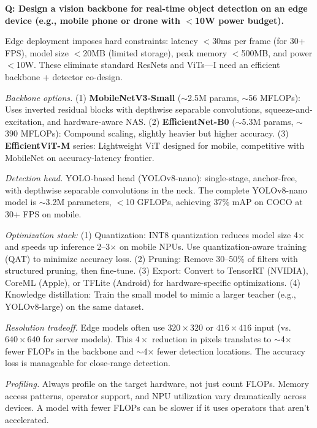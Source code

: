 \begin{interviewq}
\textbf{Q: Design a vision backbone for real-time object detection on an edge device (e.g., mobile phone or drone with $<$10W power budget).}

 \quad {} \quad \badgefreq{\freqmed}

\stronganswer Edge deployment imposes hard constraints: latency $<$30ms per frame (for 30+ FPS), model size $<$20MB (limited storage), peak memory $<$500MB, and power $<$10W. These eliminate standard ResNets and ViTs---I need an efficient backbone + detector co-design.

\textit{Backbone options.} (1) \textbf{MobileNetV3-Small} ($\sim$2.5M params, $\sim$56 MFLOPs): Uses inverted residual blocks with depthwise separable convolutions, squeeze-and-excitation, and hardware-aware NAS. (2) \textbf{EfficientNet-B0} ($\sim$5.3M params, $\sim$390 MFLOPs): Compound scaling, slightly heavier but higher accuracy. (3) \textbf{EfficientViT-M} series: Lightweight ViT designed for mobile, competitive with MobileNet on accuracy-latency frontier.

\textit{Detection head.} YOLO-based head (YOLOv8-nano): single-stage, anchor-free, with depthwise separable convolutions in the neck. The complete YOLOv8-nano model is $\sim$3.2M parameters, $<$10 GFLOPs, achieving 37\% mAP on COCO at 30+ FPS on mobile.

\textit{Optimization stack:} (1) Quantization: INT8 quantization reduces model size 4$\times$ and speeds up inference 2--3$\times$ on mobile NPUs. Use quantization-aware training (QAT) to minimize accuracy loss. (2) Pruning: Remove 30--50\% of filters with structured pruning, then fine-tune. (3) Export: Convert to TensorRT (NVIDIA), CoreML (Apple), or TFLite (Android) for hardware-specific optimizations. (4) Knowledge distillation: Train the small model to mimic a larger teacher (e.g., YOLOv8-large) on the same dataset.

\textit{Resolution tradeoff.} Edge models often use $320 \times 320$ or $416 \times 416$ input (vs.\ $640 \times 640$ for server models). This $4\times$ reduction in pixels translates to $\sim$4$\times$ fewer FLOPs in the backbone and $\sim$4$\times$ fewer detection locations. The accuracy loss is manageable for close-range detection.

\textit{Profiling.} Always profile on the target hardware, not just count FLOPs. Memory access patterns, operator support, and NPU utilization vary dramatically across devices. A model with fewer FLOPs can be slower if it uses operators that aren't accelerated.


\end{interviewq}
